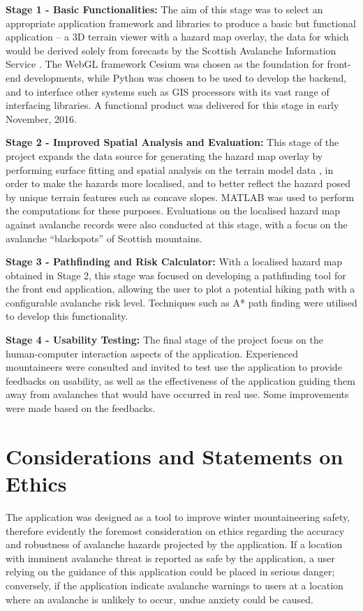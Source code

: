 \documentclass[openany]{UoYCSproject}
\begin{document}
\textbf{Stage 1 - Basic Functionalities:} The aim of this stage was to select an appropriate application framework and libraries to produce a basic but functional application -- a 3D terrain viewer with a hazard map overlay, the data for which would be derived solely from forecasts by the Scottish Avalanche Information Service \cite{sais}. The WebGL framework Cesium \cite{cesium} was chosen as the foundation for front-end developments, while Python was chosen to be used to develop the backend, and to interface other systems such as GIS processors with its vast range of interfacing libraries. A functional product was delivered for this stage in early November, 2016.

\textbf{Stage 2 - Improved Spatial Analysis and Evaluation:} This stage of the project expands the data source for generating the hazard map overlay by performing surface fitting and spatial analysis on the terrain model data \cite{os-5}, in order to make the hazards more localised, and to better reflect the hazard posed by unique terrain features such as concave slopes. MATLAB \cite{matlab-primer} was used to perform the computations for these purposes. Evaluations on the localised hazard map against avalanche records were also conducted at this stage, with a focus on the avalanche ``blackspots'' of Scottish mountains.

\textbf{Stage 3 - Pathfinding and Risk Calculator:} With a localised hazard map obtained in Stage 2, this stage was focused on developing a pathfinding tool for the front end application, allowing the user to plot a potential hiking path with a configurable avalanche risk level. Techniques such as A* path finding \cite{cui2011based} were utilised to develop this functionality. 

\textbf{Stage 4 - Usability Testing:} The final stage of the project focus on the human-computer interaction aspects of the application. Experienced mountaineers were consulted and invited to test use the application to provide feedbacks on usability, as well as the effectiveness of the application guiding them away from avalanches that would have occurred in real use. Some improvements were made based on the feedbacks.

\section{Considerations and Statements on Ethics}

The application was designed as a tool to improve winter mountaineering safety, therefore evidently the foremost consideration on ethics regarding the accuracy and robustness of avalanche hazards projected by the application. If a location with imminent avalanche threat is reported as safe by the application, a user relying on the guidance of this application could be placed in serious danger; conversely, if the application indicate avalanche warnings to users at a location where an avalanche is unlikely to occur, undue anxiety could be caused.
\end{document}
